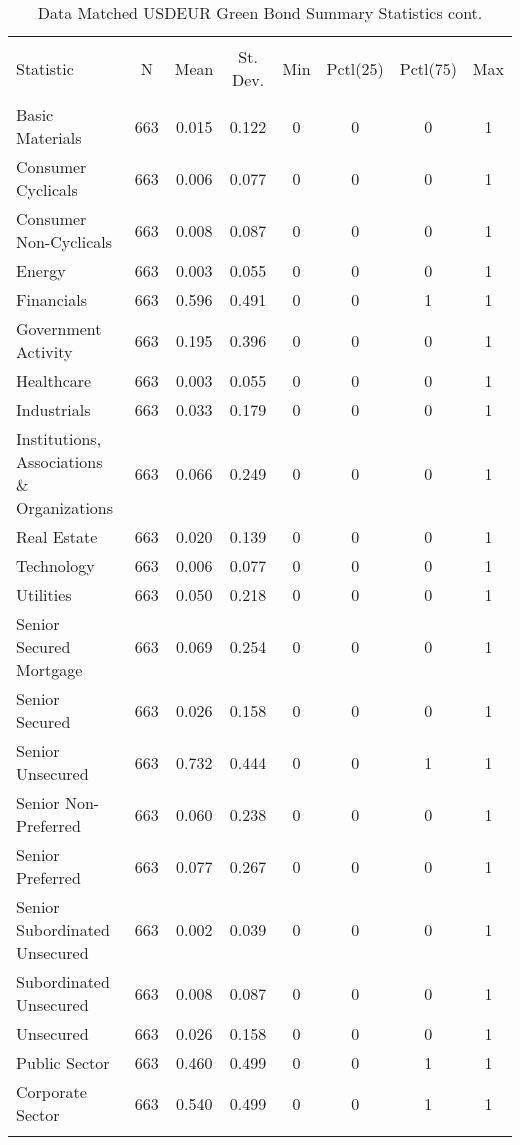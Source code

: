 \begin{table}[!htbp] \centering 
  \footnotesize
  \caption{Data Matched USDEUR Green Bond Summary Statistics cont.} 
  \label{} 
\begin{tabular}{@{\extracolsep{5pt}}lccccccc} 
\\[-1.8ex]\hline 
\hline \\[-1.8ex] 
Statistic & \multicolumn{1}{c}{N} & \multicolumn{1}{c}{Mean} & \multicolumn{1}{c}{St. Dev.} & \multicolumn{1}{c}{Min} & \multicolumn{1}{c}{Pctl(25)} & \multicolumn{1}{c}{Pctl(75)} & \multicolumn{1}{c}{Max} \\ 
\hline \\[-1.8ex] 
Basic Materials & 663 & 0.015 & 0.122 & 0 & 0 & 0 & 1 \\ 
Consumer Cyclicals & 663 & 0.006 & 0.077 & 0 & 0 & 0 & 1 \\ 
Consumer Non-Cyclicals & 663 & 0.008 & 0.087 & 0 & 0 & 0 & 1 \\
Energy & 663 & 0.003 & 0.055 & 0 & 0 & 0 & 1 \\ 
Financials & 663 & 0.596 & 0.491 & 0 & 0 & 1 & 1 \\ 
Government Activity & 663 & 0.195 & 0.396 & 0 & 0 & 0 & 1 \\ 
Healthcare & 663 & 0.003 & 0.055 & 0 & 0 & 0 & 1 \\ 
Industrials & 663 & 0.033 & 0.179 & 0 & 0 & 0 & 1 \\ 
Institutions, Associations \& Organizations & 663 & 0.066 & 0.249 & 0 & 0 & 0 & 1 \\ 
Real Estate & 663 & 0.020 & 0.139 & 0 & 0 & 0 & 1 \\ 
Technology & 663 & 0.006 & 0.077 & 0 & 0 & 0 & 1 \\ 
Utilities & 663 & 0.050 & 0.218 & 0 & 0 & 0 & 1 \\ 
Senior Secured Mortgage & 663 & 0.069 & 0.254 & 0 & 0 & 0 & 1 \\ 
Senior Secured & 663 & 0.026 & 0.158 & 0 & 0 & 0 & 1 \\ 
Senior Unsecured & 663 & 0.732 & 0.444 & 0 & 0 & 1 & 1 \\ 
Senior Non-Preferred & 663 & 0.060 & 0.238 & 0 & 0 & 0 & 1 \\ 
Senior Preferred & 663 & 0.077 & 0.267 & 0 & 0 & 0 & 1 \\ 
Senior Subordinated Unsecured & 663 & 0.002 & 0.039 & 0 & 0 & 0 & 1 \\ 
Subordinated Unsecured & 663 & 0.008 & 0.087 & 0 & 0 & 0 & 1 \\ 
Unsecured & 663 & 0.026 & 0.158 & 0 & 0 & 0 & 1 \\ 
Public Sector & 663 & 0.460 & 0.499 & 0 & 0 & 1 & 1 \\ 
Corporate Sector & 663 & 0.540 & 0.499 & 0 & 0 & 1 & 1 \\ 
\hline \\[-1.8ex] 
\end{tabular} 
\end{table} 

